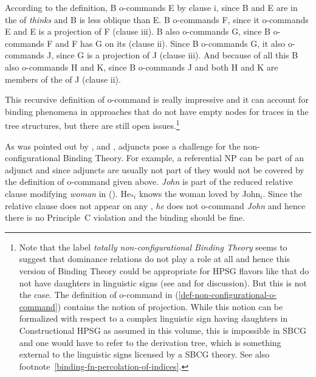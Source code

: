 \documentclass[output=paper
 	        ,biblatex
                ,babelshorthands
                ,newtxmath
                ,draftmode
                ,colorlinks, citecolor=brown
]{langscibook}
\begin{document}
According to the definition, B o-commands E by clause i, since B and E are in the \argstl of
\emph{thinks} and B is less oblique than E. B o-commands F, since it o-commands E and E
is a projection of F (clause iii). B also o-commands G, since B o-commands F and F has G on its
\argstl (clause ii). Since B o-commands G, it also o-commands J, since G is a projection of J
(clause iii). And because of all this B also o-commands H and K, since B o-commands J and both H and
K are members of the \argstl of J (clause ii). 

This recursive definition of o-command is really impressive and it can account for binding phenomena
in approaches that do not have empty nodes for traces in the tree structures, but there are still open
issues.\footnote{%
Note that the label \emph{totally non-configurational Binding Theory} seems to suggest that
dominance relations do not play a role at all and hence this version of Binding Theory could be appropriate for
HPSG flavors like \sbcg that do not have daughters in linguistic signs (see  and
 for discussion). But this is not the case. The definition of o-command in
(\ref{def-non-configurational-o-command}) contains the notion of projection. While this notion can
be formalized with respect to a complex linguistic sign having daughters in Constructional HPSG as
assumed in this volume, this is impossible in SBCG and one would have to refer to the derivation
tree, which is something external to the linguistic signs licensed by a SBCG theory. See also footnote~\ref{binding-fn-percolation-of-indices}.%
}

As was pointed out by \citet[]{HL96a}, \citet[Sect~20.4.1]{Mueller99a} and \citet{Walker2011a}, adjuncts pose a challenge for the
non-configurational Binding Theory. For example, a referential NP can be part of an adjunct and
since adjuncts are usually not part of \argstls they would not be covered by the definition of
o-command given above. \emph{John} is part of the reduced relative clause modifying \emph{woman} in
().
\ea
\label{ex-he-knows-the-woman-loved-by-John}
He$_{*i}$ knows the woman loved by John$_i$.
\z
{}
Since the relative clause does not appear on any \argstl, \emph{he} does not o-command \emph{John}
and hence there is no Principle~C violation and the binding should be fine.
\end{document}

